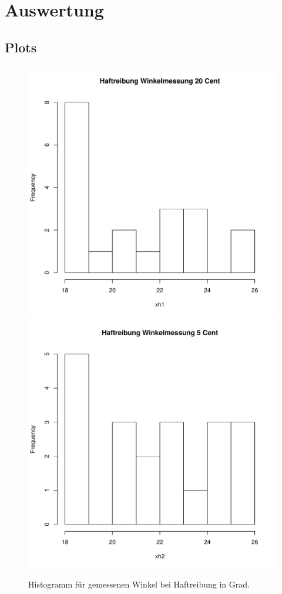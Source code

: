 \documentclass{article}
\begin{document}
\newpage
\section{Auswertung}

\subsection{Plots}


\begin{figure}[H]
\includegraphics[width=.45\textwidth]{Haft_20_cent.pdf}
\includegraphics[width=.45\textwidth]{Haft_5_cent.pdf}

\caption{Histogramm für gemessenen Winkel bei Haftreibung in Grad.}
\end{figure}
\end{document}
